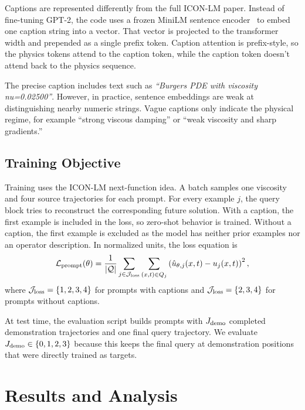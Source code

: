\documentclass[11pt]{article}
\begin{document}
Captions are represented differently from the full ICON-LM paper. Instead of
fine-tuning GPT-2, the code uses a frozen MiniLM sentence
encoder~\citep{reimers2019sentence} to embed one caption string into a vector. That
vector is projected to the transformer width and prepended as a single prefix
token. Caption attention is prefix-style, so the physics tokens attend to the caption
token, while the caption token doesn't attend back to the physics sequence.

The precise caption includes text such as
\emph{``Burgers PDE with viscosity nu=0.02500''}. However, in practice, sentence embeddings
are weak at distinguishing nearby numeric strings. Vague captions only indicate the physical regime, for example ``strong viscous
damping'' or ``weak viscosity and sharp gradients.''

\subsection{Training Objective}

Training uses the ICON-LM next-function idea. A batch samples one viscosity and
four source trajectories for each prompt. For every example $j$, the query block
tries to reconstruct the corresponding future solution. With a caption, the first
example is included in the loss, so zero-shot behavior is trained. Without a
caption, the first example is excluded as the model has neither prior examples
nor an operator description. In normalized units, the loss equation is
\begin{equation}
\mathcal{L}_{\rm prompt}(\theta)=
\frac{1}{|\mathcal{Q}|}
\sum_{j\in\mathcal{J}_{\rm loss}}
\sum_{(x,t)\in Q_j}
\left(
\hat u_{\theta,j}(x,t)-u_j(x,t)
\right)^2,
\label{eq:toy_loss}
\end{equation}
where $\mathcal{J}_{\rm loss}=\{1,2,3,4\}$ for prompts with captions and
$\mathcal{J}_{\rm loss}=\{2,3,4\}$ for prompts without captions.

At test time, the evaluation script builds prompts with $J_{\rm demo}$ completed
demonstration trajectories and one final query trajectory. We evaluate
$J_{\rm demo}\in\{0,1,2,3\}$ because this keeps the final query at demonstration
positions that were directly trained as targets.

\section{Results and Analysis}
\label{sec:results}
\end{document}
